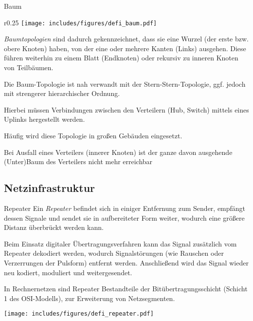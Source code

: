 \begin{defi}{Baum}
    \begin{wrapfigure}{r}{0.25\textwidth}
        \centering
        \texttt{[image: includes/figures/defi\_baum.pdf]}
    \end{wrapfigure}%
    \emph{Baumtopologien} sind dadurch gekennzeichnet, dass sie eine Wurzel (der erste bzw. obere Knoten) haben, von der eine oder mehrere Kanten (Links) ausgehen.
    Diese führen weiterhin zu einem Blatt (Endknoten) oder rekursiv zu inneren Knoten von Teilbäumen.

    Die Baum-Topologie ist nah verwandt mit der Stern-Stern-Topologie, ggf. jedoch mit strengerer hierarchischer Ordnung.

    Hierbei müssen Verbindungen zwischen den Verteilern (Hub, Switch) mittels eines Uplinks hergestellt werden.

    Häufig wird diese Topologie in großen Gebäuden eingesetzt.

    Bei Ausfall eines Verteilers (innerer Knoten) ist der ganze davon ausgehende (Unter)Baum des Verteilers nicht mehr erreichbar
\end{defi}

\subsection{Netzinfrastruktur}

\begin{defi}{Repeater}
    Ein \emph{Repeater} befindet sich in einiger Entfernung zum Sender, empfängt dessen Signale und sendet sie in aufbereiteter Form weiter, wodurch eine größere Distanz überbrückt werden kann.

    Beim Einsatz digitaler Übertragungsverfahren kann das Signal zusätzlich vom Repeater dekodiert werden, wodurch Signalstörungen (wie Rauschen oder Verzerrungen der Pulsform) entfernt werden.
    Anschließend wird das Signal wieder neu kodiert, moduliert und weitergesendet.

    In Rechnernetzen sind Repeater Bestandteile der Bitübertragungsschicht (Schicht 1 des OSI-Modells), zur Erweiterung von Netzsegmenten.

    \centering
    \texttt{[image: includes/figures/defi\_repeater.pdf]}
\end{defi}

